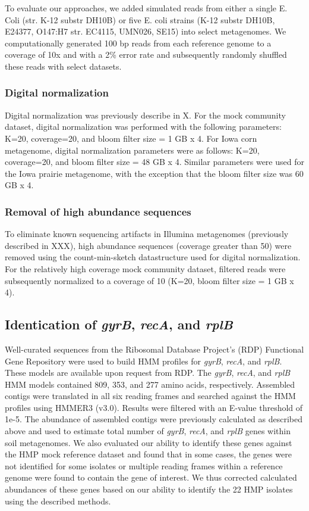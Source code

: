 \documentclass[11pt]{article} %
\begin{document}
To evaluate our approaches, we added simulated reads from either a single E. Coli (str. K-12 substr DH10B) or five E. coli strains (K-12 substr DH10B, E24377, O147:H7 str. EC4115, UMN026, SE15) into select metagenomes.  We computationally generated 100 bp reads from each reference genome to a coverage of 10x and with a 2\% error rate and subsequently randomly shuffled these reads with select datasets.


\subsubsection{Digital normalization}
Digital normalization was previously describe in X.  For the mock community dataset, digital normalization was performed with the following parameters:  K=20, coverage=20, and bloom filter size = 1 GB x 4.  For Iowa corn metagenome, digital normalization parameters were as follows:  K=20, coverage=20, and bloom filter size = 48 GB x 4.  Similar parameters were used for the Iowa prairie metagenome, with the exception that the bloom filter size was 60 GB x 4.

\subsubsection{Removal of high abundance sequences}
To eliminate known sequencing artifacts in Illumina metagenomes (previously described in XXX), high abundance sequences (coverage greater than 50) were removed using the count-min-sketch datastructure used for digital normalization.  For the relatively high coverage mock community dataset, filtered reads were subsequently normalized to a coverage of 10 (K=20, bloom filter size = 1 GB x 4).  

\subsection{Identication of \emph{gyrB}, \emph{recA}, and \emph{rplB}}
Well-curated sequences from the Ribosomal Database Project's (RDP) Functional Gene Repository were used to build HMM profiles for \emph{gyrB}, \emph{recA}, and \emph{rplB}.  These models are available upon request from RDP.  The \emph{gyrB}, \emph{recA}, and \emph{rplB} HMM models contained 809, 353, and 277 amino acids, respectively.  Assembled contigs were translated in all six reading frames and searched against the HMM profiles using HMMER3 (v3.0).  Results were filtered with an E-value threshold of 1e-5.  The abundance of assembled contigs were previously calculated as described above and used to estimate total number of \emph{gyrB}, \emph{recA}, and \emph{rplB} genes within soil metagenomes.  We also evaluated our ability to identify these genes against the HMP mock reference dataset and found that in some cases, the genes were not identified for some isolates or multiple reading frames within a reference genome were found to contain the gene of interest.  We thus corrected calculated abundances of these genes based on our ability to identify the 22 HMP isolates using the described methods.  
\end{document}
